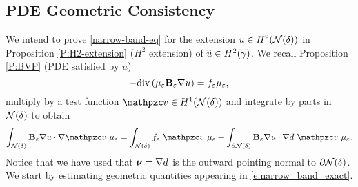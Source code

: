 \subsection{PDE Geometric Consistency}\label{s:narrow:consistency}

We intend to prove \eqref{narrow-band-eq} for the extension $u \in H^2({\mathcal{N}(\delta)})$ in Proposition \ref{P:H2-extension} ($H^2$ extension) of $\widetilde{u}\in H^2(\gamma)$. We recall Proposition \ref{P:BVP} (PDE satisfied by $u$)
%
\[
-\mathrm{div}\left(  {\mu_{\varepsilon}} {\mathbf{B}_\varepsilon} \nabla u  \right) = f_\varepsilon {\mu_{\ensuremath{\varepsilon}}},
\]
%
multiply by a test function $\tv \in H^1(\mathcal N(\delta))$ and integrate by parts in ${\mathcal{N}(\delta)}$ to obtain
%
\begin{equation}\label{e:narrow_band_exact}
\int_{\mathcal N(\delta)} \bB_\varepsilon \nabla u \cdot \nabla \tv ~\mu_\varepsilon = \int_{\mathcal N(\delta)} f_\varepsilon~ \tv ~\mu_\varepsilon
+ \int_{\partial \mathcal N(\delta)} \bB_\varepsilon \nabla u \cdot \nabla d ~ \tv ~\mu_\varepsilon.
\end{equation}
%
Notice that we have used that ${\boldsymbol \nu}=\nabla d$ is the outward pointing normal to $\partial {\mathcal{N}(\delta)}$.
%
We start by estimating geometric quantities appearing in \eqref{e:narrow_band_exact}.

